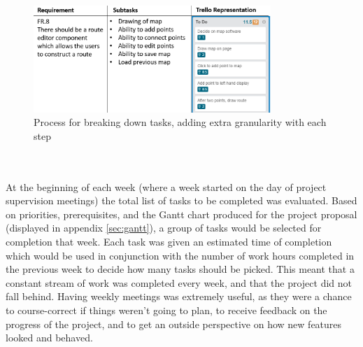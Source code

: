 \begin{figure}[!ht]
	\vspace{2mm}
	\begin{center}
		\includegraphics[width=0.8\textwidth]{images/implementation/task_breakdown.png}
	\end{center}
	\vspace{-6mm}
	\caption{Process for breaking down tasks, adding extra granularity with each step}
	\vspace{-10mm}	
\end{figure}
\ \\
\ \\
At the beginning of each week (where a week started on the day of project supervision meetings) the total list of tasks to be completed was evaluated. Based on priorities, prerequisites, and the Gantt chart produced for the project proposal (displayed in appendix \ref{sec:gantt}), a group of tasks would be selected for completion that week. Each task was given an estimated time of completion which would be used in conjunction with the number of work hours completed in the previous week to decide how many tasks should be picked. This meant that a constant stream of work was completed every week, and that the project did not fall behind. Having weekly meetings was extremely useful, as they were a chance to course-correct if things weren't going to plan, to receive feedback on the progress of the project, and to get an outside perspective on how new features looked and behaved.

\newpage 
